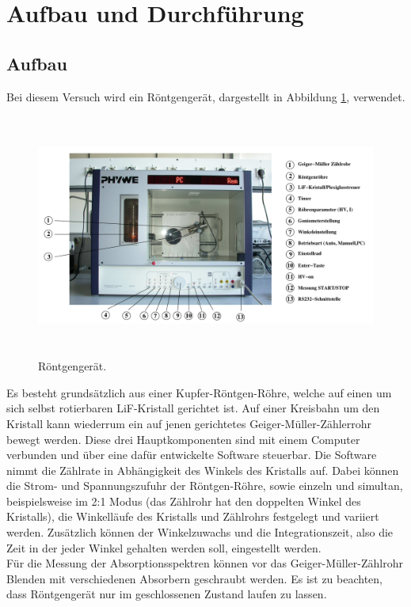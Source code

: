 \section{Aufbau und Durchführung}
\subsection{Aufbau}
\label{sec:Aufbau}

Bei diesem Versuch wird ein Röntgengerät, dargestellt in Abbildung \ref{abb:1}, verwendet.
\begin{figure}[H]
  \centering
  \includegraphics[height=8cm]{ressources/aufbau.png}
  \caption{Röntgengerät. \cite{skript}}
  \label{abb:1}
\end{figure}
Es besteht grundsätzlich aus einer Kupfer-Röntgen-Röhre, welche auf einen um sich selbst rotierbaren LiF-Kristall gerichtet ist.
Auf einer Kreisbahn um den Kristall kann wiederrum ein auf jenen gerichtetes Geiger-Müller-Zählerrohr bewegt werden.
Diese drei Hauptkomponenten sind mit einem Computer verbunden und über eine dafür entwickelte Software steuerbar.
Die Software nimmt die Zählrate in Abhängigkeit des Winkels des Kristalls auf.
Dabei können die Strom- und Spannungszufuhr der Röntgen-Röhre, sowie einzeln und simultan, beispielsweise im 2:1 Modus (das Zählrohr hat den doppelten Winkel des Kristalls), die Winkelläufe des Kristalls und Zählrohrs festgelegt und variiert werden.
Zusätzlich können der Winkelzuwachs und die Integrationszeit, also die Zeit in der jeder Winkel gehalten werden soll, eingestellt werden.\\
Für die Messung der Absorptionsspektren können vor das Geiger-Müller-Zählrohr Blenden mit verschiedenen Absorbern geschraubt werden.
Es ist zu beachten, dass Röntgengerät nur im geschlossenen Zustand laufen zu lassen.
